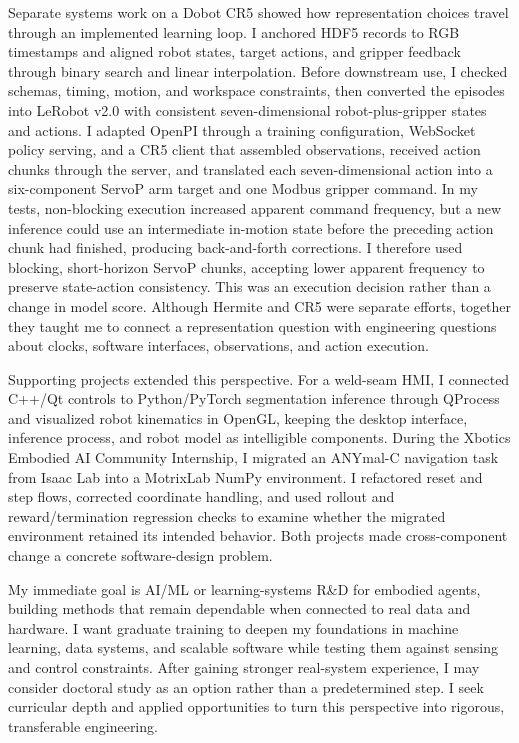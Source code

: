 Separate systems work on a Dobot CR5 showed how representation choices travel through an implemented learning loop. I anchored HDF5 records to RGB timestamps and aligned robot states, target actions, and gripper feedback through binary search and linear interpolation. Before downstream use, I checked schemas, timing, motion, and workspace constraints, then converted the episodes into LeRobot v2.0 with consistent seven-dimensional robot-plus-gripper states and actions. I adapted OpenPI through a training configuration, WebSocket policy serving, and a CR5 client that assembled observations, received action chunks through the server, and translated each seven-dimensional action into a six-component ServoP arm target and one Modbus gripper command. In my tests, non-blocking execution increased apparent command frequency, but a new inference could use an intermediate in-motion state before the preceding action chunk had finished, producing back-and-forth corrections. I therefore used blocking, short-horizon ServoP chunks, accepting lower apparent frequency to preserve state-action consistency. This was an execution decision rather than a change in model score. Although Hermite and CR5 were separate efforts, together they taught me to connect a representation question with engineering questions about clocks, software interfaces, observations, and action execution.

Supporting projects extended this perspective. For a weld-seam HMI, I connected C++/Qt controls to Python/PyTorch segmentation inference through QProcess and visualized robot kinematics in OpenGL, keeping the desktop interface, inference process, and robot model as intelligible components. During the Xbotics Embodied AI Community Internship, I migrated an ANYmal-C navigation task from Isaac Lab into a MotrixLab NumPy environment. I refactored reset and step flows, corrected coordinate handling, and used rollout and reward/termination regression checks to examine whether the migrated environment retained its intended behavior. Both projects made cross-component change a concrete software-design problem.

My immediate goal is AI/ML or learning-systems R\&D for embodied agents, building methods that remain dependable when connected to real data and hardware. I want graduate training to deepen my foundations in machine learning, data systems, and scalable software while testing them against sensing and control constraints. After gaining stronger real-system experience, I may consider doctoral study as an option rather than a predetermined step. I seek curricular depth and applied opportunities to turn this perspective into rigorous, transferable engineering.
